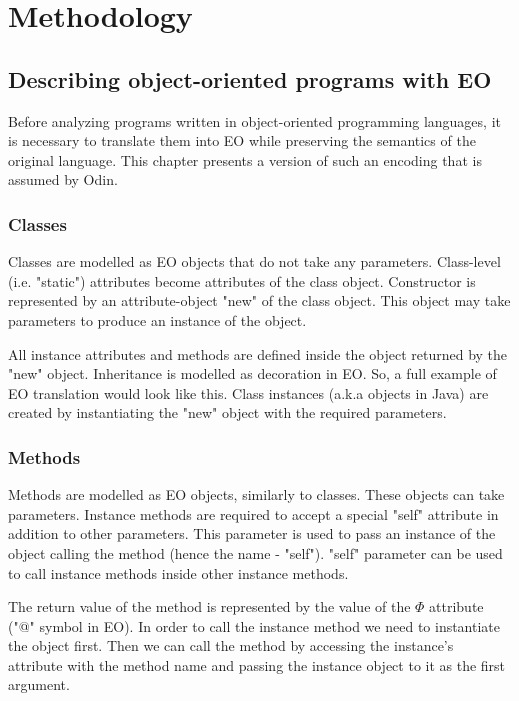 \chapter{Methodology}
\label{chap:met}

\section{Describing object-oriented programs with EO}
Before analyzing programs written in object-oriented programming languages, it is necessary to translate them into EO while preserving the semantics of the original language. This chapter presents a version of such an encoding that is assumed by Odin.

\subsection{Classes}
Classes are modelled as EO objects that do not take any parameters. Class-level (i.e. "static") attributes become attributes of the class object. Constructor is represented by an attribute-object "new" of the class object. This object may take parameters to produce an instance of the object.

All instance attributes and methods are defined inside the object returned by the "new" object. Inheritance is modelled as decoration in EO. So, a full example of EO translation would look like this. Class instances (a.k.a objects in Java) are created
by instantiating the "new" object with the required parameters.


\subsection{Methods}
Methods are modelled as EO objects, similarly to classes. These objects can take parameters.
Instance methods are required to accept a special "self" attribute in addition to other parameters. This parameter is used to pass an instance of the object calling the method (hence the name - "self"). 
"self" parameter can be used to call instance methods inside other instance methods.

The return value of the method is represented by the value of the $\Phi$ attribute ("@" symbol in EO). In order to call the instance method we need to instantiate the object first. Then we can call the method by accessing the instance's attribute with the method name and passing the instance object to it as the first argument.
